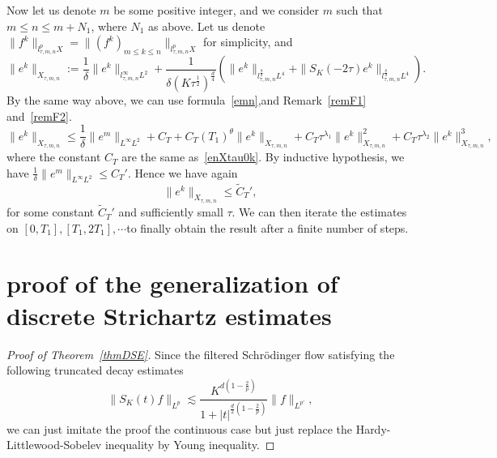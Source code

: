 \documentclass[10pt,a4paper]{article}
\begin{document}
  Now let us denote \(m\) be some positive integer, and we consider \(m\) such
  that \( m \leq n \leq m+N_1\), where \(N_1\) as above.
  Let us denote 
  \( \|f^k\|_{l^p_{\tau,m,n}X} = \|(f^k)_{m\leq k\leq n}\|_{l^p_{\tau,m,n}X} \)
  for simplicity, and 
  \[
      \|e^k\|_{X_{\tau,m,n}} := \frac1\delta \|e^k\|_{l^\infty_{\tau,m,n}L^2} 
      + \frac1{\delta(K\tau^\frac12)^\frac d4} \left(\|e^k\|_{l^\frac8d_{\tau,m,n}L^4}
      + \|S_K(-2\tau)e^k\|_{l^\frac8d_{\tau,m,n}L^4}\right).
  \]
  By the same way above, we can use formula~\eqref{emn},and Remark~\ref{remF1}
  and~\ref{remF2}. 
  \begin{equation}\label{enXtaumn}
    \|e^k\|_{X_{\tau,m,n}} \leq \frac1\delta \|e^m\|_{L^\infty L^2} + C_T + C_T (T_1)^{\theta}
    \|e^k\|_{X_{\tau,m,n}} + C_T \tau^{\lambda_1} \|e^k\|_{X_{\tau,m,n}}^2 
    + C_T \tau^{\lambda_2} \|e^k\|_{X_{\tau,m,n}}^3,
  \end{equation}
  where the constant \(C_T\) are the same as~\eqref{enXtau0k}.
  By inductive hypothesis, we have \( \frac1\delta \|e^m\|_{L^\infty L^2} \leq C_T'\).
  Hence we have again 
  \[ \|e^k\|_{X_{\tau,m,n}} \leq \widetilde C_T', \]
  for some constant \(\widetilde C_T'\) and sufficiently small \(\tau\).
  We can then iterate the estimates on \([0,T_1],[T_1,2T_1],\cdots\)to finally
  obtain the result after a finite number of steps.
  \section{proof of the generalization of discrete Strichartz estimates}
  \begin{proof}[Proof of Theorem~\ref{thmDSE}]
    Since the filtered Schr\"odinger flow satisfying the following truncated
    decay estimates
    \[ \|S_K(t)f\|_{L^p} \lesssim
    \frac{K^{d(1-\frac2p)}}{1+|t|^{\frac{d}2(1-\frac2p)}}\|f\|_{L^{p'}},\]
    we can just imitate the proof the continuous case but just replace the 
    Hardy-Littlewood-Sobelev inequality by Young inequality.
  \end{proof}
\end{document}

